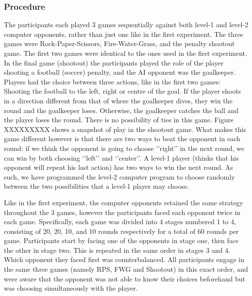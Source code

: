 \documentclass[man,floatsintext]{apa6}
\begin{document}
\hypertarget{procedure-1}{%
\subsubsection{Procedure}\label{procedure-1}}

The participants each played 3 games sequentially against both level-1 and level-2 computer opponents, rather than just one like in the first experiment. The three games were Rock-Paper-Scissors, Fire-Water-Grass, and the penalty shootout game. The first two games were identical to the ones used in the first experiment. In the final game (shootout) the participants played the role of the player shooting a football (soccer) penalty, and the AI opponent was the goalkeeper. Players had the choice between three actions, like in the first two games: Shooting the football to the left, right or centre of the goal. If the player shoots in a direction different from that of where the goalkeeper dives, they win the round and the goalkeeper loses. Otherwise, the goalkeeper catches the ball and the player loses the round. There is no possibility of ties in this game. Figure XXXXXXXXX shows a snapshot of play in the shootout game. What makes this game different however is that there are two ways to beat the opponent in each round: if we think the opponent is going to choose `'right'' in the next round, we can win by both choosing `'left'' and `'center''. A level-1 player (thinks that his opponent will repeat his last action) has two ways to win the next round. As such, we have programmed the level-2 computer program to choose randomly between the two possibilities that a level-1 player may choose.

Like in the first experiment, the computer opponents retained the same strategy throughout the 3 games, however the participants faced each opponent twice in each game. Specifically, each game was divided into 4 stages numbered 1 to 4, consisting of 20, 20, 10, and 10 rounds respectively for a total of 60 rounds per game. Participants start by facing one of the opponents in stage one, then face the other in stage two. This is repeated in the same order in stages 3 and 4. Which opponent they faced first was counterbalanced. All participants engage in the same three games (namely RPS, FWG and Shootout) in this exact order, and were aware that the opponent was not able to know their choices beforehand but was choosing simultaneously with the player.
\end{document}
